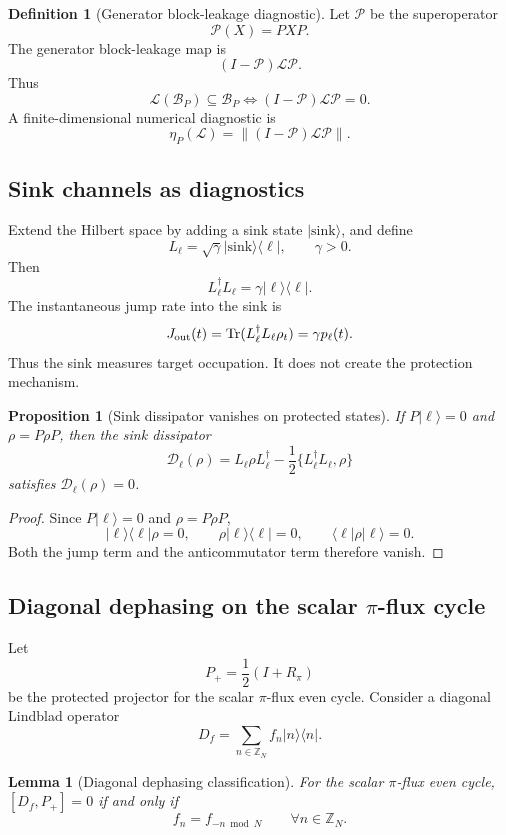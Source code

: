 \documentclass[11pt]{article}
\newtheorem{proposition}[theorem]{Proposition}
\newtheorem{lemma}[theorem]{Lemma}
\theoremstyle{definition}
\newtheorem{definition}[theorem]{Definition}
\newcommand{\Tr}{\operatorname{Tr}}
\begin{document}
\begin{definition}[Generator block-leakage diagnostic]
Let $\mathcal P$ be the superoperator
\[
\mathcal P(X)=PXP.
\]
The generator block-leakage map is
\[
(I-\mathcal P)\mathcal L\mathcal P.
\]
Thus
\[
\mathcal L(\mathcal B_P)\subseteq\mathcal B_P \Longleftrightarrow (I-\mathcal P)\mathcal L\mathcal P=0.
\]
A finite-dimensional numerical diagnostic is
\[
\eta_P(\mathcal L)=\|(I-\mathcal P)\mathcal L\mathcal P\|.
\]
\end{definition}

\subsection{Sink channels as diagnostics}
Extend the Hilbert space by adding a sink state $|\mathrm{sink}\rangle$, and define
\[
L_\ell=\sqrt\gamma |\mathrm{sink}\rangle\langle \ell|,
\qquad \gamma>0.
\]
Then
\[
L_\ell^\dagger L_\ell=\gamma |\ell\rangle\langle \ell|.
\]
The instantaneous jump rate into the sink is
\[
J_{\rm out}(t)=\Tr(L_\ell^\dagger L_\ell\rho_t)=\gamma p_\ell(t).
\]
Thus the sink measures target occupation. It does not create the protection mechanism.

\begin{proposition}[Sink dissipator vanishes on protected states]
If $P|\ell\rangle=0$ and $\rho=P\rho P$, then the sink dissipator
\[
\mathcal D_\ell(\rho)=L_\ell\rho L_\ell^\dagger-\frac12\{L_\ell^\dagger L_\ell,\rho\}
\]
satisfies $\mathcal D_\ell(\rho)=0$.
\end{proposition}

\begin{proof}
Since $P|\ell\rangle=0$ and $\rho=P\rho P$,
\[
|\ell\rangle\langle\ell|\rho=0,
\qquad \rho|\ell\rangle\langle\ell|=0,
\qquad \langle \ell|\rho|\ell\rangle=0.
\]
Both the jump term and the anticommutator term therefore vanish.
\end{proof}

\subsection{Diagonal dephasing on the scalar $\pi$-flux cycle}
Let
\[
P_+=\frac12(I+R_\pi)
\]
be the protected projector for the scalar $\pi$-flux even cycle. Consider a diagonal Lindblad operator
\[
D_f=\sum_{n\in\mathbb Z_N}f_n|n\rangle\langle n|.
\]

\begin{lemma}[Diagonal dephasing classification]
For the scalar $\pi$-flux even cycle, $[D_f,P_+]=0$ if and only if
\[
f_n=f_{-n\bmod N}\qquad \forall n\in\mathbb Z_N.
\]
\end{lemma}
\end{document}
